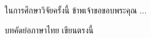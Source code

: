 \documentclass[a4paper,12pt]{upthesis}
\begin{document}

\newpage
\begin{acknowledgement}     %
\baselineskip=8mm
\setcounter{page}{2}

ในการศึกษาวิจัยครั้งนี้ ข้าพเจ้าขอขอบพระคุณ ...

\vspace{0.5cm}
\begin{flushright}
\makeauthor
\end{flushright}

\end{acknowledgement}


\renewcommand{\arraystretch}{1.1}


\newpage
\begin{abstractth}	%

บทคัดย่อภาษาไทย เขียนตรงนี้


\end{abstractth}

\newpage

\renewcommand{\arraystretch}{1}


%   

\newpage
\tableofcontents
\clearpage


\listoftables
\clearpage
\end{document}
